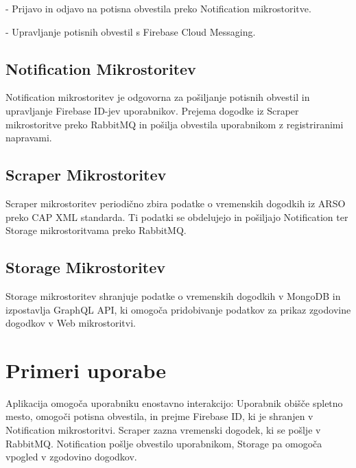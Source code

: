 \documentclass[a4paper,11pt]{article}
\begin{document}
- Prijavo in odjavo na potisna obvestila preko Notification mikrostoritve.

- Upravljanje potisnih obvestil s Firebase Cloud Messaging.

\subsection*{Notification Mikrostoritev}
Notification mikrostoritev je odgovorna za po\v{s}iljanje potisnih obvestil in upravljanje Firebase ID-jev uporabnikov. Prejema dogodke iz Scraper mikrostoritve preko RabbitMQ in po\v{s}ilja obvestila uporabnikom z registriranimi napravami.

\subsection*{Scraper Mikrostoritev}
Scraper mikrostoritev periodi\v{c}no zbira podatke o vremenskih dogodkih iz ARSO preko CAP XML standarda. Ti podatki se obdelujejo in po\v{s}iljajo Notification ter Storage mikrostoritvama preko RabbitMQ.

\subsection*{Storage Mikrostoritev}
Storage mikrostoritev shranjuje podatke o vremenskih dogodkih v MongoDB in izpostavlja GraphQL API, ki omogo\v{c}a pridobivanje podatkov za prikaz zgodovine dogodkov v Web mikrostoritvi.

\section*{Primeri uporabe}
Aplikacija omogo\v{c}a uporabniku enostavno interakcijo:
Uporabnik obi\v{s}\v{c}e spletno mesto, omogo\v{c}i potisna obvestila, in prejme Firebase ID, ki je shranjen v Notification mikrostoritvi. Scraper zazna vremenski dogodek, ki se po\v{s}lje v RabbitMQ. Notification po\v{s}lje obvestilo uporabnikom, Storage pa omogo\v{c}a vpogled v zgodovino dogodkov.
\end{document}
